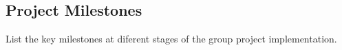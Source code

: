 \subsection{Project Milestones}

List the key milestones at diferent stages of the group project implementation.